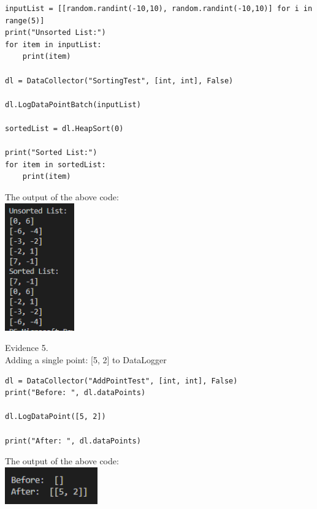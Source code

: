 \begin{flushleft}
\begin{center}
        \begin{verbatim}
inputList = [[random.randint(-10,10), random.randint(-10,10)] for i in range(5)]
print("Unsorted List:")
for item in inputList:
    print(item)

dl = DataCollector("SortingTest", [int, int], False)

dl.LogDataPointBatch(inputList)

sortedList = dl.HeapSort(0)

print("Sorted List:")
for item in sortedList:
    print(item)
        \end{verbatim}

        The output of the above code: \\
        \includegraphics[width=3cm]{Images/Testing/T4.1.1.PNG} \\

        \vspace{1cm}

        {\large Evidence 5.\rn } \\ 
        \vspace{0.3cm}
        Adding a single point: [5, 2] to DataLogger \\

        \begin{verbatim}
dl = DataCollector("AddPointTest", [int, int], False)
print("Before: ", dl.dataPoints)

dl.LogDataPoint([5, 2])

print("After: ", dl.dataPoints)
        \end{verbatim}

        The output of the above code: \\
        \includegraphics[width=4cm]{Images/Testing/T4.2.1.PNG} \\
        \vspace{1cm}


\end{center}
\end{flushleft}

